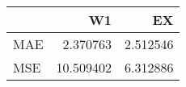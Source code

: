 \begin{tabular}{lrr}
\toprule
{} &         W1 &        EX \\
\midrule
MAE &   2.370763 &  2.512546 \\
MSE &  10.509402 &  6.312886 \\
\bottomrule
\end{tabular}
